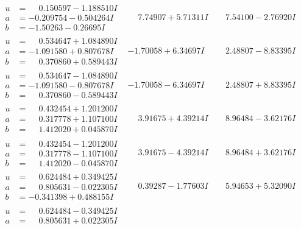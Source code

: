 \documentclass[1p]{elsarticle_modified}
\theoremstyle{definition}
\begin{document}
$$\begin{array}{c|c|c}
\begin{aligned}
u &= \phantom{-}0.150597 - 1.188510 I \\
a &= -0.209754 - 0.504264 I \\
b &= -1.50263 - 0.26695 I\end{aligned}
 & \phantom{-}7.74907 + 5.71311 I & \phantom{-}7.54100 - 2.76920 I \\ \hline\begin{aligned}
u &= \phantom{-}0.534647 + 1.084890 I \\
a &= -1.091580 + 0.807678 I \\
b &= \phantom{-}0.370860 + 0.589443 I\end{aligned}
 & -1.70058 + 6.34697 I & \phantom{-}2.48807 - 8.83395 I \\ \hline\begin{aligned}
u &= \phantom{-}0.534647 - 1.084890 I \\
a &= -1.091580 - 0.807678 I \\
b &= \phantom{-}0.370860 - 0.589443 I\end{aligned}
 & -1.70058 - 6.34697 I & \phantom{-}2.48807 + 8.83395 I \\ \hline\begin{aligned}
u &= \phantom{-}0.432454 + 1.201200 I \\
a &= \phantom{-}0.317778 + 1.107100 I \\
b &= \phantom{-}1.412020 + 0.045870 I\end{aligned}
 & \phantom{-}3.91675 + 4.39214 I & \phantom{-}8.96484 - 3.62176 I \\ \hline\begin{aligned}
u &= \phantom{-}0.432454 - 1.201200 I \\
a &= \phantom{-}0.317778 - 1.107100 I \\
b &= \phantom{-}1.412020 - 0.045870 I\end{aligned}
 & \phantom{-}3.91675 - 4.39214 I & \phantom{-}8.96484 + 3.62176 I \\ \hline\begin{aligned}
u &= \phantom{-}0.624484 + 0.349425 I \\
a &= \phantom{-}0.805631 - 0.022305 I \\
b &= -0.341398 + 0.488155 I\end{aligned}
 & \phantom{-}0.39287 - 1.77603 I & \phantom{-}5.94653 + 5.32090 I \\ \hline\begin{aligned}
u &= \phantom{-}0.624484 - 0.349425 I \\
a &= \phantom{-}0.805631 + 0.022305 I \\

\end{aligned}
\end{array}$$
\end{document}

